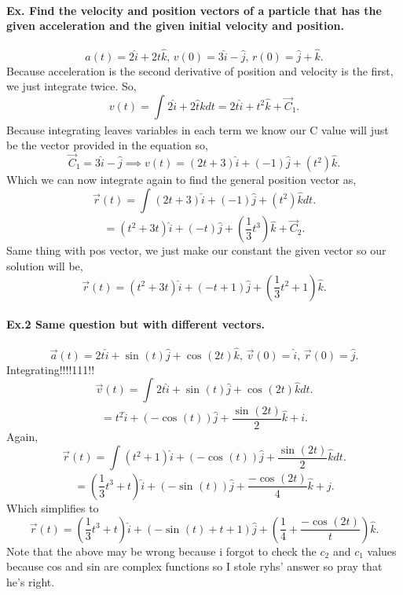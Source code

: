 \documentclass{report}
\begin{document}
\begin{multicols}{2}
\paragraph{Ex. Find the velocity and position vectors of a particle that has the given acceleration and the given initial velocity and position.}

\[
a\left( t \right) = 2\hat{i} + 2t\hat{k}\text{, }v\left( 0 \right) = 3\hat{ i }-\hat{ j }\text{, }r\left( 0 \right) = \hat{j} + \hat{k}
.\] 
Because acceleration is the second derivative of position and velocity is the first, we just integrate twice. So,
\[
v\left( t \right) = \int_{  }^{  } 2\hat{ i }+2\hat{t}k dt = 2t\hat{i} + t^2\hat{k} + \vec{ C }_1
.\] 
Because integrating leaves variables in each term we know our C value will just be the vector provided in the equation so,
\[
\vec{ C }_1 = 3\hat{ i }-\hat{ j } \implies v\left( t \right) = \left( 2t+3 \right) \hat{ i } + \left( -1 \right) \hat{ j } + \left( t^2 \right) \hat{ k }
.\]  
Which we can now integrate again to find the general position vector as,
\[
\vec{ r }\left( t \right) = \int_{  }^{  } \left( 2t+3 \right) \hat{i} + \left( -1 \right) \hat{j} + \left( t^2 \right) \hat{k} dt
.\] 
\[
= \left( t^2+3t \right) \hat{i} + \left( -t \right) \hat{j} + \left( \frac{ 1 }{ 3 } t^3 \right) \hat{k} + \vec{ C }_2
.\] 
Same thing with pos vector, we just make our constant the given vector so our solution will be,
\[
\vec{ r }\left( t \right) = \left( t^2+3t \right) \hat{ i } + \left( -t+1 \right) \hat{j} + \left( \frac{ 1 }{ 3 } t^2+1 \right) \hat{k}
.\] 
\paragraph{Ex.2 Same question but with different vectors.}
\[
\vec{ a }\left( t \right) = 2t\hat{i} + \sin^{  } \left( t \right) \hat{j} + \cos^{  } \left( 2t \right) \hat{k}\text{, } \vec{ v }\left( 0 \right) = \hat{i}\text{, } \vec{ r }\left( 0 \right) = \hat{j}
.\] 
Integrating!!!!111!!
\[
\vec{ v }\left( t \right) = \int_{  }^{  } 2t\hat{i} + \sin^{  } \left( t \right) \hat{j}+ \cos^{  } \left( 2t \right) \hat{k}dt
.\] 
\[
=t^2\hat{i} + \left( -\cos^{  } \left( t \right)  \right) \hat{ j } + \frac{ \sin^{  } \left( 2t \right)  }{ 2 }\hat{k} + i
.\] 
Again,
\[
\vec{ r }\left( t \right) = \int_{  }^{  } \left( t^2+1 \right) \hat{i} + \left( -\cos^{  } \left( t \right)  \right) \hat{j} + \frac{ \sin^{  } \left( 2t \right)  }{ 2 }\hat{k}dt
.\] 
\[
=\left( \frac{ 1 }{ 3 } t^3 + t \right) \hat{i} + \left( -\sin^{  } \left( t \right)  \right) \hat{j} + \frac{ -\cos^{  } \left( 2t \right)  }{ 4 }\hat{k} + j
.\] 
Which simplifies to
\[
\vec{ r }\left( t \right) = \left( \frac{ 1 }{ 3 } t^3 + t \right) \hat{i} + \left( -\sin^{  } \left( t \right) +t+1 \right) \hat{j} + \left( \frac{ 1 }{ 4 } + \frac{ -\cos^{  } \left( 2t \right)  }{ t } \right) \hat{k}
.\] 
Note that the above may be wrong because i forgot to check the $ c_2 $ and $ c_1 $ values because cos and sin are complex functions so I stole ryhs' answer so pray that he's right.

\end{multicols}
\end{document}

